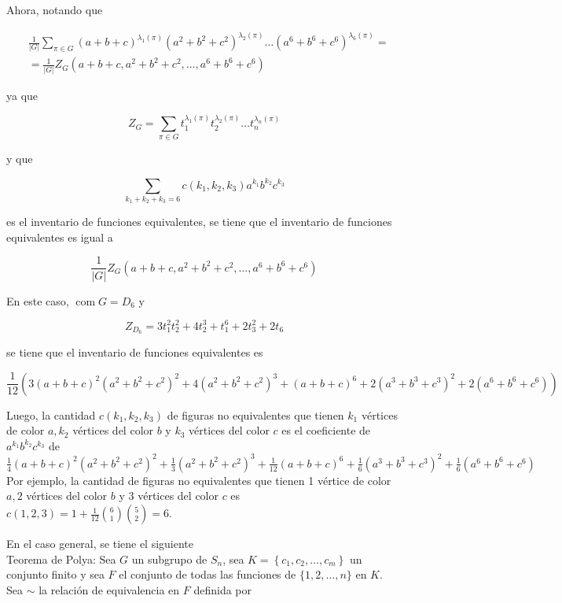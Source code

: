 \documentclass[10pt]{article}
\begin{document}
Ahora, notando que

$$
\begin{aligned}
& \frac{1}{|G|} \sum_{\pi \in G}(a+b+c)^{\lambda_{1}(\pi)}\left(a^{2}+b^{2}+c^{2}\right)^{\lambda_{2}(\pi)} \ldots\left(a^{6}+b^{6}+c^{6}\right)^{\lambda_{6}(\pi)}= \\
& =\frac{1}{|G|} Z_{G}\left(a+b+c, a^{2}+b^{2}+c^{2}, \ldots, a^{6}+b^{6}+c^{6}\right)
\end{aligned}
$$

ya que

$$
Z_{G}=\sum_{\pi \in G} t_{1}^{\lambda_{1}(\pi)} t_{2}^{\lambda_{2}(\pi)} \ldots t_{n}^{\lambda_{n}(\pi)}
$$

y que

$$
\sum_{k_{1}+k_{2}+k_{3}=6} c\left(k_{1}, k_{2}, k_{3}\right) a^{k_{1}} b^{k_{2}} c^{k_{3}}
$$

es el inventario de funciones equivalentes, se tiene que el inventario de funciones equivalentes es igual a

$$
\frac{1}{|G|} Z_{G}\left(a+b+c, a^{2}+b^{2}+c^{2}, \ldots, a^{6}+b^{6}+c^{6}\right)
$$

En este caso, $\operatorname{com} G=D_{6}$ y

$$
Z_{D_{6}}=3 t_{1}^{2} t_{2}^{2}+4 t_{2}^{3}+t_{1}^{6}+2 t_{3}^{2}+2 t_{6}
$$

se tiene que el inventario de funciones equivalentes es

$$
\frac{1}{12}\left(3(a+b+c)^{2}\left(a^{2}+b^{2}+c^{2}\right)^{2}+4\left(a^{2}+b^{2}+c^{2}\right)^{3}+(a+b+c)^{6}+2\left(a^{3}+b^{3}+c^{3}\right)^{2}+2\left(a^{6}+b^{6}+c^{6}\right)\right)
$$

Luego, la cantidad $c\left(k_{1}, k_{2}, k_{3}\right)$ de figuras no equivalentes que tienen $k_{1}$ vértices de color $a, k_{2}$ vértices del color $b$ y $k_{3}$ vértices del color $c$ es el coeficiente de $a^{k_{1}} b^{k_{2}} c^{k_{3}}$ de\\
$\frac{1}{4}(a+b+c)^{2}\left(a^{2}+b^{2}+c^{2}\right)^{2}+\frac{1}{3}\left(a^{2}+b^{2}+c^{2}\right)^{3}+\frac{1}{12}(a+b+c)^{6}+\frac{1}{6}\left(a^{3}+b^{3}+c^{3}\right)^{2}+\frac{1}{6}\left(a^{6}+b^{6}+c^{6}\right)$\\
Por ejemplo, la cantidad de figuras no equivalentes que tienen 1 vértice de color $a, 2$ vértices del color $b$ y 3 vértices del color $c$ es $c(1,2,3)=1+\frac{1}{12}\binom{6}{1}\binom{5}{2}=6$.

En el caso general, se tiene el siguiente\\
Teorema de Polya: Sea $G$ un subgrupo de $S_{n}$, sea $K=\left\{c_{1}, c_{2}, \ldots, c_{m}\right\}$ un conjunto finito y sea $F$ el conjunto de todas las funciones de $\{1,2, \ldots, n\}$ en $K$.\\
Sea $\sim$ la relación de equivalencia en $F$ definida por
\end{document}
